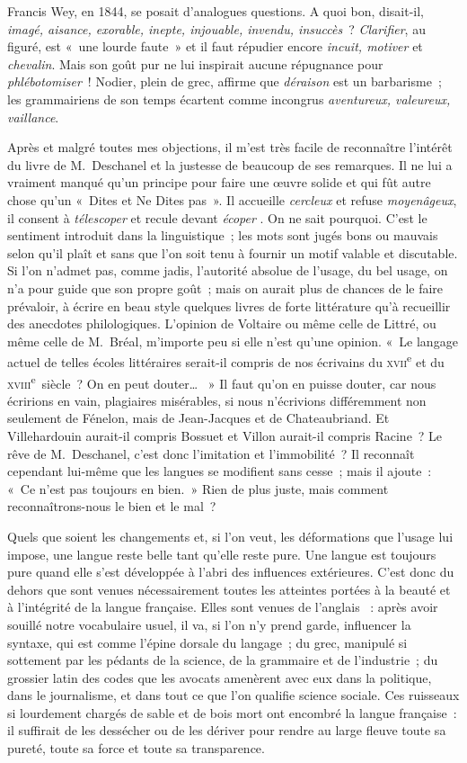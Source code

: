 \documentclass[french,twoside]{book} %
\begin{document}
Francis Wey, en 1844, se posait d’analogues questions. A quoi bon, disait-il, {\itshape imagé, aisance, exorable, inepte, injouable, invendu, insuccès} ? {\itshape Clarifier}, au figuré, est « une lourde faute » et il faut répudier encore {\itshape incuit, motiver} et {\itshape chevalin}. Mais son goût pur ne lui inspirait aucune répugnance pour {\itshape phlébotomiser} ! Nodier, plein de grec, affirme que {\itshape déraison} est un barbarisme ; les grammairiens de son temps écartent comme incongrus {\itshape aventureux, valeureux, vaillance}.\par
Après et malgré toutes mes objections, il m’est très facile de reconnaître l’intérêt du livre de M. Deschanel et la justesse de beaucoup de ses remarques. Il ne lui a vraiment manqué qu’un principe pour faire une œuvre solide et qui fût autre chose qu’un « Dites et Ne Dites pas ». Il accueille {\itshape cercleux} et refuse {\itshape moyenâgeux}, il consent à {\itshape télescoper} et recule devant {\itshape écoper} . On ne sait pourquoi. C’est le sentiment introduit dans la linguistique ; les mots sont jugés bons ou mauvais selon qu’il plaît et sans que l’on soit tenu à fournir un motif valable et discutable. Si l’on n’admet pas, comme jadis, l’autorité absolue de l’usage, du bel usage, on n’a pour guide que son propre goût ; mais on aurait plus de chances de le faire prévaloir, à écrire en beau style quelques livres de forte littérature qu’à recueillir des anecdotes philologiques. L’opinion de Voltaire ou même celle de Littré, ou même celle de M. Bréal, m’importe peu si elle n’est qu’une opinion. « Le langage actuel de telles écoles littéraires serait-il compris de nos écrivains du \textsc{xvii}\textsuperscript{e} et du \textsc{xviii}\textsuperscript{e} siècle ? On en peut douter…  » Il faut qu’on en puisse douter, car nous écririons en vain, plagiaires misérables, si nous n’écrivions différemment non seulement de Fénelon, mais de Jean-Jacques et de Chateaubriand. Et Villehardouin aurait-il compris Bossuet et Villon aurait-il compris Racine ? Le rêve de M. Deschanel, c’est donc l’imitation et l’immobilité ? Il reconnaît cependant lui-même que les langues se modifient sans cesse ; mais il ajoute : « Ce n’est pas toujours en bien. » Rien de plus juste, mais comment reconnaîtrons-nous le bien et le mal ?\par
Quels que soient les changements et, si l’on veut, les déformations que l’usage lui impose, une langue reste belle tant qu’elle reste pure. Une langue est toujours pure quand elle s’est développée à l’abri des influences extérieures. C’est donc du dehors que sont venues nécessairement toutes les atteintes portées à la beauté et à l’intégrité de la langue française. Elles sont venues de l’anglais  : après avoir souillé notre vocabulaire usuel, il va, si l’on n’y prend garde, influencer la syntaxe, qui est comme l’épine dorsale du langage ; du grec, manipulé si sottement par les pédants de la science, de la grammaire et de l’industrie ; du grossier latin des codes que les avocats amenèrent avec eux dans la politique, dans le journalisme, et dans tout ce que l’on qualifie science sociale. Ces ruisseaux si lourdement chargés de sable et de bois mort ont encombré la langue française : il suffirait de les dessécher ou de les dériver pour rendre au large fleuve toute sa pureté, toute sa force et toute sa transparence.
\end{document}
